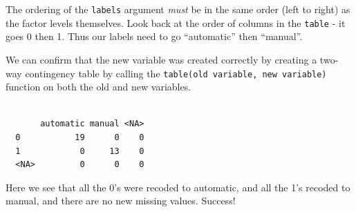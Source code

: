 \documentclass[
  letterpaper,
  DIV=11,
  numbers=noendperiod,
  oneside]{scrreprt}
\newenvironment{Shaded}{\begin{snugshade}}{\end{snugshade}}
\newcommand{\AttributeTok}[1]{\textcolor[rgb]{0.40,0.45,0.13}{#1}}
\newcommand{\FunctionTok}[1]{\textcolor[rgb]{0.28,0.35,0.67}{#1}}
\newcommand{\NormalTok}[1]{\textcolor[rgb]{0.00,0.23,0.31}{#1}}
\newcommand{\OtherTok}[1]{\textcolor[rgb]{0.00,0.23,0.31}{#1}}
\newcommand{\SpecialCharTok}[1]{\textcolor[rgb]{0.37,0.37,0.37}{#1}}
\newcommand{\StringTok}[1]{\textcolor[rgb]{0.13,0.47,0.30}{#1}}
\begin{document}
\begin{Shaded}
\end{Shaded}

The ordering of the \texttt{labels} argument \emph{must} be in the same
order (left to right) as the factor levels themselves. Look back at the
order of columns in the \texttt{table} - it goes 0 then 1. Thus our
labels need to go ``automatic'' then ``manual''.

\begin{tcolorbox}[enhanced jigsaw, bottomrule=.15mm, colback=white, colframe=quarto-callout-important-color-frame, toprule=.15mm, coltitle=black, rightrule=.15mm, opacitybacktitle=0.6, colbacktitle=quarto-callout-important-color!10!white, toptitle=1mm, leftrule=.75mm, breakable, bottomtitle=1mm, titlerule=0mm, title=\textcolor{quarto-callout-important-color}{\faExclamation}\hspace{0.5em}{Trust but verify}, arc=.35mm, left=2mm, opacityback=0]

We can confirm that the new variable was created correctly by creating a
two-way contingency table by calling the
\texttt{table(old\ variable,\ new\ variable)} function on both the old
and new variables.

\end{tcolorbox}

\begin{Shaded}
\end{Shaded}

\begin{verbatim}
      
       automatic manual <NA>
  0           19      0    0
  1            0     13    0
  <NA>         0      0    0
\end{verbatim}

Here we see that all the 0's were recoded to automatic, and all the 1's
recoded to manual, and there are no new missing values. Success!
\end{document}
